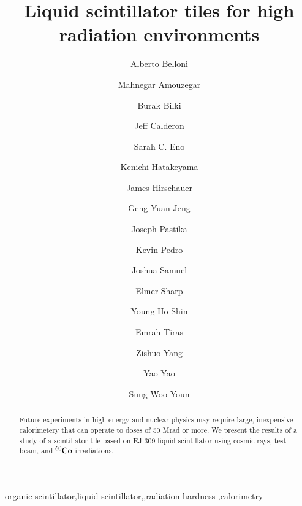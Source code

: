 \documentclass[review]{elsarticle}
\begin{document}
\begin{frontmatter}

\title{Liquid scintillator tiles for high radiation environments }


\author[umd]{Alberto Belloni}
\author[umd]{Mahnegar Amouzegar}
\author[iowa]{Burak Bilki}
\author[umd]{Jeff Calderon}
\author[umd]{Sarah C. Eno}
\author[baylor]{Kenichi Hatakeyama}
\author[fnal]{James Hirschauer}
\author[umd]{Geng-Yuan Jeng}
\author[baylor]{Joseph Pastika}
\author[fnal]{Kevin Pedro}
\author[umd]{Joshua Samuel}
\author[elmer]{Elmer Sharp}
\author[umd]{Young Ho Shin}
\author[baylor]{Emrah Tiras}
\author[umd]{Zishuo Yang}
\author[umd]{Yao Yao}
\author[korea]{Sung Woo Youn}




\address[umd]{Dept. Physics, U. Maryland, College Park MD 30742 USA}
\address[eljen]{Eljen Technology, 1300 W. Broadway, Sweetwater, Tx 79556 USA}
\address[korea]{Institute for Basic Science, Center for Axion and Precision Physics Research, IBS Center for Axion and Precision Physics Research
Room 4315, Department of Physics, Natural Science Building (E6-2), KAIST,
291 Daehak-ro, Yuseong-gu, Daejeon 305-701, South Korea}
\address[elmer]{Elmer Sharp Engineering, 7007 Leesville Blvd. Springfield, VA 22151}
\address[fnal]{Fermi National Accelerator Laboratory, Batavia, IL, USA}
\address[baylor]{Baylor University, Waco, Texas, USA}
\address[iowa]{The University of Iowa, Iowa City, IA, USA}

\begin{abstract}
Future experiments in high energy and nuclear physics may require large, inexpensive calorimetery that can operate to doses of 50 Mrad or more.
We present the results of a study of a scintillator tile based on EJ-309 liquid scintillator using cosmic rays, test beam, and $\rm{^{60}Co}$ irradiations. 
\end{abstract}

\begin{keyword}
organic scintillator\sep liquid scintillator\sep \sep radiation hardness \sep calorimetry
\end{keyword}

\end{frontmatter}

\linenumbers
\end{document}
